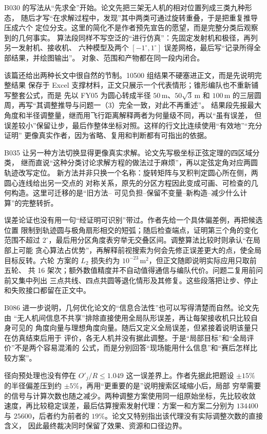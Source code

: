 B030 的写法从“先求全”开始。论文先把三架无人机的相对位置列成三类九种形态，
随后才写“在求解过程中，发现”其中两类可通过旋转重叠，于是把重复推导压成六个
定位分支。这里的简化不是作者预先宣告的愿望，而是完整分类后观察到的几何事实。
算法段同样不写空泛的“进行仿真”：先固定发射机和极径，再列另一发射机、接收机、
六种模型及两个 $[-1^\circ,1^\circ]$ 误差网格，最后写“记录所得全部结果，并绘图输出”。
对象、范围和产物都在同一段内闭合。

该篇还给出两种长文中很自然的节制。10500 组结果不硬塞进正文，而是先说明完整结果
保存于 Excel 支撑材料，正文只展示一个代表情形；锥形编队也不重新铺写整套公式，而是
先以 FY05 为圆心转成半径 $50\,\mathrm{m}$、$50\sqrt{3}\,\mathrm{m}$ 和
$100\,\mathrm{m}$ 的三层圆周，再写“其调整推导与问题一（3）完全一致，对此不再重述”。
结果段先报最大角度和半径调整量，继而用飞行距离解释两者为何量级不同，再以“虽有误差，
但误差较小”保留让步，最后作整体坐标对照。这样的行文比连续使用“有效地”“充分证明”
更像真实作者，因为省略、复用和判断都有可指出的依据。

B035 让另一种方法切换显得更像真实求解。论文先写极坐标正弦定理的四区域分类，
继而直说“这种分类讨论求解方程的做法过于麻烦”，再以定弦定角对应两圆轨迹改写定位。
新方法并非只换一个名称：旋转矩阵与叉积判定圆心所在侧，两圆心连线给出另一交点的
对称关系，原先的分区方程因此变成可画、可检查的几何构造。这里可迁移的是“旧方法--
可见负担--保留不变量--新构造--减少什么计算”的完整转折。

误差论证也没有用一句“经证明可识别”带过。作者先给一个具体偏差例，再把候选位置
限制到轨迹圆与极角扇形相交的短弧；随后检查端点，证明第三个角的变化范围不超过
$2^\circ$，最后用分区角度表穷举无交叠区间。调整算法比较时则承认“在局部上可能
贪心算法占优势”，再解释前视搜索为何会先修正误差更大的点，使全局目标反转。六轮
方案的 $L_2$ 损失约为 $10^{-23}\,\mathrm{m}^2$，但正文随即说明实际应用只取前五轮、
共 16 架次；额外数值精度并不自动值得通信与编队代价。问题二复用前问前又集中列出
三点共线、四点共圆等退化情形及其修复。这些段落把让步、停止和失败接口都留在正文中。

B086 进一步说明，几何优化论文的“信息合法性”也可以写得清楚而自然。论文先由
“无人机间信息不共享”排除直接使用全局队形误差，再让每架接收机只比较自身可见的
角度向量与理想角度向量。随后又定义全局误差，但紧接着说明该量只在仿真结束后用于
评价，各无人机并没有据此调整。于是“局部目标”和“全局评价”不是两个容易混淆的
公式，而是分别回答“现场能用什么信息”和“赛后怎样比较方案”。

径向预处理也没有停在 $O'_j/R\leq1.049$ 这一误差界上。作者先据此把题设
$\pm15\%$ 的半径偏差压到约 $\pm5\%$，再用“更重要的是”说明搜索区域缩小后，局部
穷举需要的信号与计算次数也随之减少。两种调整方案使用同一组原始坐标，先比较收敛
速度，再比较稳定误差，最后估算搜索发射代理：方案一和方案二分别为 $134400$ 与
$25600$，后者约为前者的 $19\%$。论文又特别指出该代理没有实际调整次数的直接含义，
因此最终裁决同时保留了效果、资源和口径边界。

